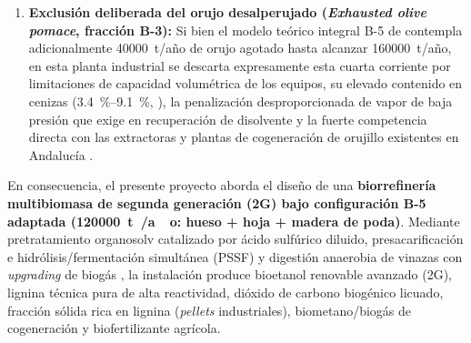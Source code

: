 \documentclass{report}
\begin{document}
\begin{enumerate}
    \item \textbf{Exclusión deliberada del orujo desalperujado (\textit{Exhausted olive pomace}, fracción B-3):} Si bien el modelo teórico integral B-5 de \textcite[Tabla~6 y Tabla~8]{Jafari-Gohargan2026} contempla adicionalmente \num{40000}~t/año de orujo agotado hasta alcanzar \num{160000}~t/año, en esta planta industrial se descarta expresamente esta cuarta corriente por limitaciones de capacidad volumétrica de los equipos, su elevado contenido en cenizas (\SI{3.4}{\percent}--\SI{9.1}{\percent}, \textcite[Tabla~1]{MoranAlarcon2026}), la penalización desproporcionada de vapor de baja presión que exige en recuperación de disolvente \autocite[Tabla~8]{Jafari-Gohargan2026} y la fuerte competencia directa con las extractoras y plantas de cogeneración de orujillo existentes en Andalucía \autocite[Sección~4.2.3]{APPA2026}.
\end{enumerate}

En consecuencia, el presente proyecto aborda el diseño de una \textbf{biorrefinería multibiomasa de segunda generación (2G) bajo configuración B-5 adaptada (\SI{120000}{\tonne{}/ao}: hueso + hoja + madera de poda)}. Mediante pretratamiento organosolv catalizado por ácido sulfúrico diluido, presacarificación e hidrólisis/fermentación simultánea (PSSF) y digestión anaerobia de vinazas con \textit{upgrading} de biogás \autocite[Fig.~1]{Jafari-Gohargan2026, Padilla-Rascon2022}, la instalación produce bioetanol renovable avanzado (2G), lignina técnica pura de alta reactividad, dióxido de carbono biogénico licuado, fracción sólida rica en lignina (\textit{pellets} industriales), biometano/biogás de cogeneración y biofertilizante agrícola.
\end{document}
